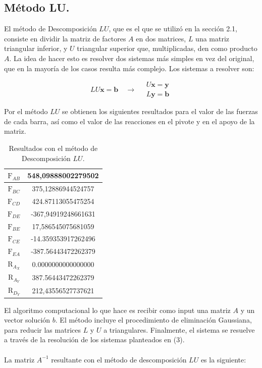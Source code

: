 \documentclass[12pt, notitlepage]{article}
\begin{document}
\newpage

\subsection{Método LU.}
El método de Descomposición $LU$, que es el que se utilizó en la sección 2.1, consiste en dividir la matriz de factores $A$ en dos matrices, $L$ una matriz triangular inferior, y $U$ triangular superior que, multiplicadas, den como producto $A$. La idea de hacer esto es resolver dos sistemas más simples en vez del original, que en la mayoría de los casos resulta más complejo. Los sistemas a resolver son:

\begin{equation}
LU\mathbf{x} = \mathbf{b} \quad \longrightarrow \quad \begin{matrix} U\mathbf{x}=\mathbf{y} \\
L \mathbf{y} = \mathbf{b}
\end{matrix}
\end{equation}

Por el método $LU$ se obtienen los siguientes resultados para el valor de las fuerzas de cada barra, así como el valor de las reacciones en el pivote y en el apoyo de la matriz.

\begin{table}[H]
\centering
\caption{Resultados con el método de Descomposición $LU$.}
\begin{tabular}{|c|c|} \hline
$\text{F}_{AB}$ & 548,09888002279502\\ \hline $\text{F}_{BC}$ & 375,12886944524757 \\ \hline $\text{F}_{CD}$ & 424.87113055475254 \\ \hline $\text{F}_{DE}$ & -367,94919248661631 \\ \hline $\text{F}_{BE}$ & 17,586545075681059 \\ \hline $\text{F}_{CE}$ & -14.359353917262496 \\ \hline $\text{F}_{EA}$ & -387.56443472262379  \\ \hline $\text{R}_{A_X}$ & 0.0000000000000000  \\ \hline $\text{R}_{A_Y}$ & 387.56443472262379 \\ \hline $\text{R}_{D_Y}$ & 212,43556527737621\\ \hline
\end{tabular}
\end{table}

El algoritmo computacional lo que hace es recibir como input una matriz $A$ y un vector solución $b$. El método incluye el procedimiento de eliminación Gaussiana, para reducir las matrices $L$ y $U$ a triangulares. Finalmente, el sistema se resuelve a través de la resolución de los sistemas planteados en (3).\\\\
La matriz $A^{-1}$ resultante con el método de descomposición $LU$ es la siguiente:
\end{document}
